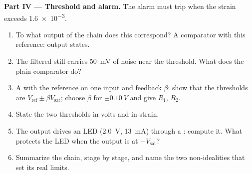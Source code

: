 \begin{problem}
\medskip
\noindent\textbf{Part IV --- Threshold and alarm.}
The alarm must trip when the strain exceeds \num{1.6e-3}.
\begin{enumerate}[resume]
  \item To what output  of the chain does this correspond? A
        comparator with this reference: output states.
  \item The filtered  still carries \qty{50}{mV} of noise near
        the threshold. What does the plain comparator do?
  \item A  with the reference on one input and feedback
        $\beta$: show that the thresholds are $V_{\mathrm{ref}} \pm
        \beta V_{\mathrm{sat}}$; choose $\beta$ for $\pm\qty{0.10}{V}$
        and give $R_1$, $R_2$.
  \item State the two thresholds in volts and in strain.
  \item The output drives an LED (\qty{2.0}{V}, \qty{13}{mA}) through a
        : compute it. What protects the LED when the output is
        at $-V_{\mathrm{sat}}$?
  \item Summarize the chain, stage by stage, and name the two
        non-idealities that set its real limits.
\end{enumerate}
\end{problem}
